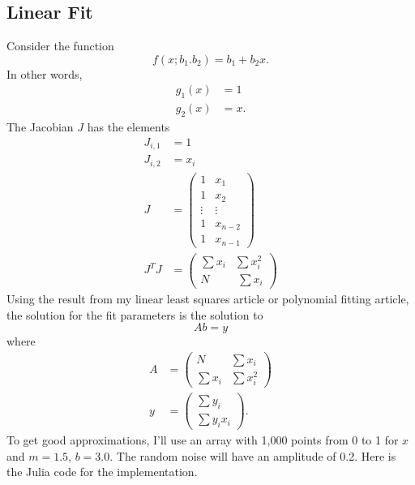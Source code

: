 \documentclass{scrartcl}
\begin{document}
\subsection{Linear Fit}
Consider the function
\begin{equation}
f(x; b_1. b_2) = b_1 + b_2 x.
\end{equation}
In other words,
\begin{align}
g_1(x) &= 1\\
g_2(x) &= x.
\end{align}
The Jacobian $J$ has the elements
\begin{align}
J_{i,1} &= 1\\
J_{i,2} &= x_i\\
J &= \left(\begin{array}{cc}
1 & x_1 \\
1 & x_2 \\
\vdots & \vdots \\
1 & x_{n-2} \\
1 & x_{n-1}
\end{array}\right)\\
J^{T}J &= \left(\begin{array}{cc}
\sum x_i & \sum x_i^2 \\
N & \
\sum x_i \end{array}\right)
\end{align}
Using the result from my linear least squares article\cite{linLS}
or polynomial fitting article\cite{polyfit}, the solution for the fit
parameters is the solution to
\begin{equation}
Ab=y
\end{equation}
where
\begin{align}
A &= \left(\begin{array}{cc}
N & \sum x_i \\
\sum x_i & \sum x_i^2 \end{array}\right)\\
y &= \left(\begin{array}{c}
\sum y_i \\
\sum y_i x_i
\end{array}\right).
\end{align}
To get good approximations, I'll use an array with 1,000
points from 0 to 1 for $x$ and $m=1.5$, $b=3.0$. The random
noise will have an amplitude of 0.2. Here is the Julia code
for the implementation.
\end{document}
